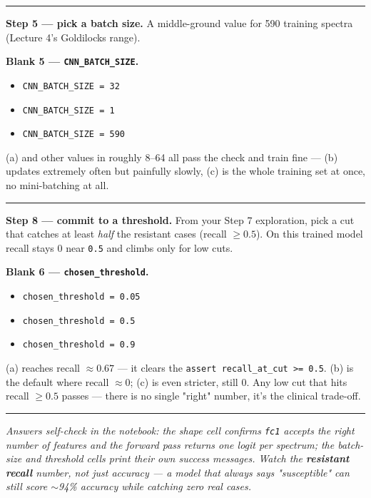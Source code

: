 \documentclass[11pt]{article}
\newcommand{\opt}[1]{\texttt{#1}}
\begin{document}
\vspace{3pt}\hrule\vspace{4pt}

\textbf{Step 5 --- pick a batch size.}\; {\small A middle-ground value for 590 training spectra
(Lecture 4's Goldilocks range).}

\textbf{Blank 5 --- \texttt{CNN\_BATCH\_SIZE}.}
\begin{itemize}
  \item[(a)] \opt{CNN\_BATCH\_SIZE = 32}
  \item[(b)] \opt{CNN\_BATCH\_SIZE = 1}
  \item[(c)] \opt{CNN\_BATCH\_SIZE = 590}
\end{itemize}
{\small (a) and other values in roughly 8--64 all pass the check and train fine --- (b) updates
extremely often but painfully slowly, (c) is the whole training set at once, no mini-batching at all.}

\vspace{3pt}\hrule\vspace{4pt}

\textbf{Step 8 --- commit to a threshold.}\; {\small From your Step 7 exploration, pick a cut that
catches at least \emph{half} the resistant cases (recall $\geq 0.5$). On this trained model recall
stays 0 near \texttt{0.5} and climbs only for low cuts.}

\textbf{Blank 6 --- \texttt{chosen\_threshold}.}
\begin{itemize}
  \item[(a)] \opt{chosen\_threshold = 0.05}
  \item[(b)] \opt{chosen\_threshold = 0.5}
  \item[(c)] \opt{chosen\_threshold = 0.9}
\end{itemize}
{\small (a) reaches recall $\approx 0.67$ --- it clears the \texttt{assert recall\_at\_cut >= 0.5}.
(b) is the default where recall $\approx 0$; (c) is even stricter, still $0$. Any low cut that hits
recall $\geq 0.5$ passes --- there is no single "right" number, it's the clinical trade-off.}

\vspace{4pt}\hrule\vspace{3pt}
{\small\itshape Answers self-check in the notebook: the shape cell confirms \texttt{fc1} accepts the
right number of features and the forward pass returns one logit per spectrum; the batch-size and
threshold cells print their own success messages. Watch the \textbf{resistant recall} number, not just
accuracy --- a model that always says "susceptible" can still score $\sim$94\% accuracy while catching
zero real cases.}
\end{document}
